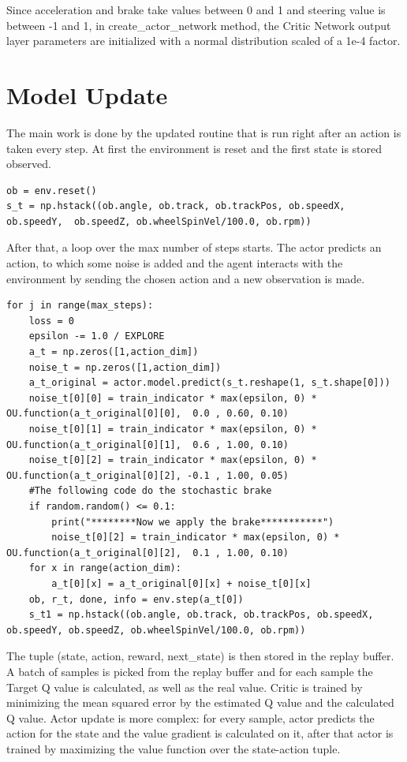 \documentclass[Lau,oneside,noexaminfo]{sapthesis} %
\begin{document}
Since acceleration and brake take values between 0 and 1 and steering value is between -1 and 1, in create\_actor\_network method, the Critic Network output layer parameters are initialized with a normal distribution scaled of a 1e-4 factor.

\section{Model Update}
The main work is done by the updated routine that is run right after an action is taken every step.
At first the environment is reset and the first state is stored observed.
\begin{lstlisting}
ob = env.reset()
s_t = np.hstack((ob.angle, ob.track, ob.trackPos, ob.speedX, ob.speedY,  ob.speedZ, ob.wheelSpinVel/100.0, ob.rpm))
\end{lstlisting}
After that, a loop over the max number of steps starts. The actor predicts an action, to which some noise is added and the agent interacts with the environment by sending the chosen action and a new observation is made.
\begin{lstlisting}
for j in range(max_steps):
    loss = 0 
    epsilon -= 1.0 / EXPLORE
    a_t = np.zeros([1,action_dim])
    noise_t = np.zeros([1,action_dim])
    a_t_original = actor.model.predict(s_t.reshape(1, s_t.shape[0]))
    noise_t[0][0] = train_indicator * max(epsilon, 0) * OU.function(a_t_original[0][0],  0.0 , 0.60, 0.10)
    noise_t[0][1] = train_indicator * max(epsilon, 0) * OU.function(a_t_original[0][1],  0.6 , 1.00, 0.10)
    noise_t[0][2] = train_indicator * max(epsilon, 0) * OU.function(a_t_original[0][2], -0.1 , 1.00, 0.05)
    #The following code do the stochastic brake
    if random.random() <= 0.1:
        print("********Now we apply the brake***********")
        noise_t[0][2] = train_indicator * max(epsilon, 0) * OU.function(a_t_original[0][2],  0.1 , 1.00, 0.10)
    for x in range(action_dim):
        a_t[0][x] = a_t_original[0][x] + noise_t[0][x]
    ob, r_t, done, info = env.step(a_t[0])
    s_t1 = np.hstack((ob.angle, ob.track, ob.trackPos, ob.speedX, ob.speedY, ob.speedZ, ob.wheelSpinVel/100.0, ob.rpm))
\end{lstlisting}
The tuple (state, action, reward, next\_state) is then stored in the replay buffer. A batch of samples is picked from the replay buffer and for each sample the Target Q value is calculated, as well as the real value. \newline
Critic is trained by minimizing the mean squared error by the estimated Q value and the calculated Q value. Actor update is more complex: for every sample, actor predicts the action for the state and the value gradient is calculated on it, after that actor is trained by maximizing the value function over the state-action tuple. \newline
\end{document}

